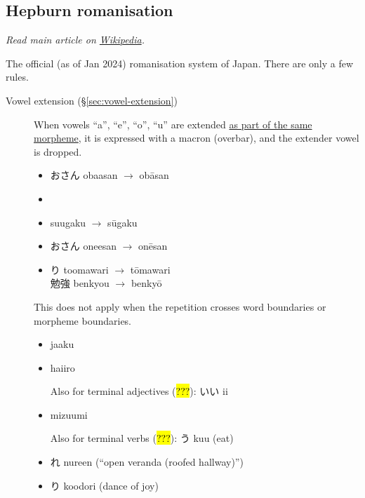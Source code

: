 \documentclass[../nihongo-gakushuu-kyouzai.tex]{subfiles}
\begin{document}
\subsection{Hepburn romanisation} \label{sec:hepburn-romanisation}
\emph{Read main article on \href{https://en.wikipedia.org/wiki/Hepburn_romanization}{Wikipedia}.}

The official (as of Jan 2024) romanisation system of Japan. There are only a few rules.
\begin{description}
    \item[Vowel extension (\S\ref{sec:vowel-extension})] When vowels ``a'', ``e'', ``o'', ``u'' are extended \ul{as part of the same morpheme}, it is expressed with a macron (overbar), and the extender vowel is dropped. 

    \begin{itemize}
        \item おさん obaasan $\to$ ob\=asan
        \item {}
        \item {} suugaku $\to$ s\=ugaku
        \item おさん oneesan $\to$ on\=esan\\
        \item {}り toomawari $\to$ t\=omawari\\
        勉強 benkyou $\to$ benky\=o
    \end{itemize}

    This does not apply when the repetition crosses word boundaries or morpheme boundaries.

    \begin{itemize}
        \item {} jaaku
        \item {} haiiro

        Also for terminal adjectives (\hl{???}): いい ii
        \item {} mizuumi

        Also for terminal verbs (\hl{???}): う kuu (eat)
        \item {}れ nureen (``open veranda (roofed hallway)'')
        \item {}り koodori (dance of joy)


\end{itemize}
\end{description}
\end{document}
